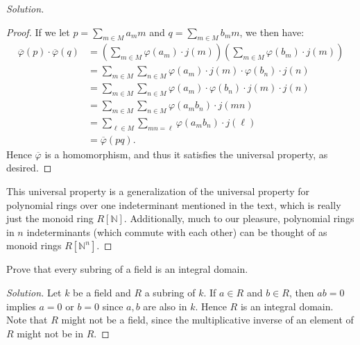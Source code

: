 \documentclass[12pt]{article}
\newenvironment{problem}[2][Problem]{\begin{trivlist}
\item[\hskip \labelsep {\bfseries #1}\hskip \labelsep {\bfseries #2.}]}{\end{trivlist}}
\newenvironment{solution}
  {\renewcommand\qedsymbol{$\blacksquare$}\begin{proof}[Solution]}
{\end{proof}}
\newenvironment{sproof}{
  \renewcommand\qedsymbol{$\square$}
  \begin{proof}
  }{
  \end{proof}
}
\theoremstyle{remark}
\begin{document}
\begin{solution}
\begin{sproof}
  If we let $p=\sum_{m\in M}a_mm$ and $q=\sum_{m\in M}b_mm$, we then have:
    \begin{align*}
      \overline\varphi(p)\cdot \overline\varphi(q) 
      &= \left( \sum_{m\in M} \varphi(a_m)\cdot j(m) \right)
         \left( \sum_{m\in M} \varphi(b_m)\cdot j(m) \right) \\
      &= \sum_{m\in M} \sum_{n\in M} \varphi(a_m)\cdot j(m)\cdot \varphi(b_n)\cdot j(n) \\
      &= \sum_{m\in M} \sum_{n\in M} \varphi(a_m)\cdot \varphi(b_n)\cdot j(m)\cdot j(n) \\
      &= \sum_{m\in M} \sum_{n\in M} \varphi(a_mb_n)\cdot j(mn) \\
      &= \sum_{\ell\in M} \sum_{mn=\ell} \varphi(a_mb_n)\cdot j(\ell) \\
      &= \overline\varphi(pq).
    \end{align*}
    Hence $\overline\varphi$ is a homomorphism, and thus it satisfies the universal property, as
    desired.
  \end{sproof}
  \indent This universal property is a generalization of the universal property for polynomial rings over
  one indeterminant mentioned in the text, which is really just the monoid ring $R[\mathbb{N}]$.
  Additionally, much to our pleasure, polynomial rings in $n$ indeterminants (which commute with each other)
  can be thought of
  as monoid rings $R\left[\mathbb{N}^n\right]$.
\end{solution}

\begin{problem}{2.8}
Prove that every subring of a field is an integral domain.
\end{problem}
\begin{solution}
  Let $k$ be a field and $R$ a subring of $k$.
  If $a\in R$ and $b\in R$, then $ab=0$ implies $a=0$ or $b=0$ since $a,b$ are also in $k$. 
  Hence $R$ is an integral domain.
  Note that $R$ might not be a field, since the multiplicative inverse of an element of $R$ might
  not be in $R$.
\end{solution}
\end{document}
